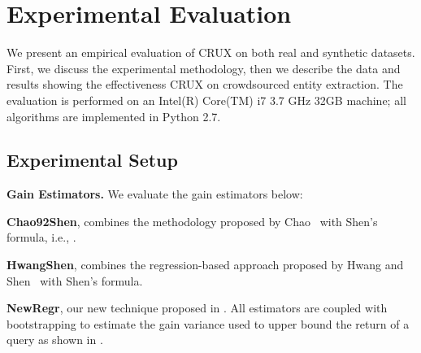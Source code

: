 

\section{Experimental Evaluation}
\label{sec:exps}
We present an empirical evaluation of CRUX on both real and synthetic datasets. First, we discuss the experimental methodology, then we describe the data and results showing the effectiveness CRUX on crowdsourced entity extraction. The evaluation is performed on an Intel(R) Core(TM) i7 3.7 GHz 32GB machine; all algorithms are implemented in Python 2.7. 

\subsection{Experimental Setup}
\label{sec:expsetup}
\noindent\textbf{Gain Estimators.} We evaluate the gain estimators below:
\squishlist
\item {\bf Chao92Shen}, combines the methodology proposed by Chao~\cite{chao:1992} with Shen's formula, i.e., .
\item {\bf HwangShen}, combines the regression-based approach proposed by Hwang and Shen~\cite{hwang:2010} with Shen's formula. 
\item {\bf NewRegr}, our new technique proposed in .
\squishend
All estimators are coupled with bootstrapping to estimate the gain variance used to upper bound the return of a query as shown in .

